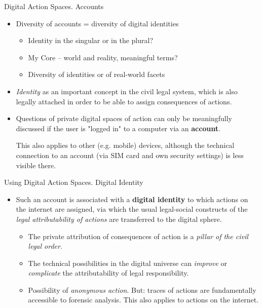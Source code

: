 \documentclass{beamer}
\begin{document}
\begin{frame}{Digital Action Spaces. Accounts}
  \begin{itemize}
  \item Diversity of accounts = diversity of digital identities
    \begin{itemize}
    \item Identity in the singular or in the plural?
    \item My Core -- world and reality, meaningful terms?
    \item Diversity of identities or of real-world facets
    \end{itemize}
  \item \emph{Identity} as an important concept in the civil legal system,
    which is also legally attached in order to be able to assign consequences
    of actions.
\item Questions of private digital spaces of action can only be meaningfully
  discussed if the user is "logged in" to a computer via an \textbf{account}.

  This also applies to other (e.g. mobile) devices, although the technical
  connection to an account (via SIM card and own security settings) is less
  visible there.
  \end{itemize}
\end{frame}
\begin{frame}{Using Digital Action Spaces. Digital Identity}  
\begin{itemize}
\item Such an account is associated with a \textbf{digital identity} to which
  actions on the internet are assigned, via which the usual legal-social
  constructs of the \emph{legal attributability of actions} are transferred to
  the digital sphere.  
  \begin{itemize}
  \item The private attribution of consequences of action is a \emph{pillar of
    the civil legal order}.
  \item The technical possibilities in the digital universe can \emph{improve}
    or \emph{complicate} the attributability of legal responsibility.
  \item Possibility of \emph{anonymous action}. But: traces of actions are
    fundamentally accessible to forensic analysis. This also applies to
    actions on the internet.
  \end{itemize}
\end{itemize}
\end{frame}
\end{document}
